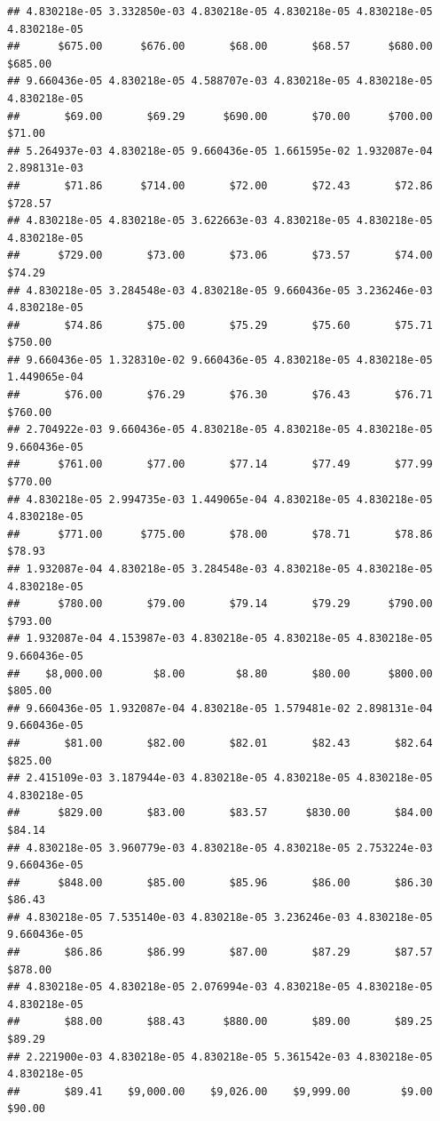 \begin{verbatim}
## 4.830218e-05 3.332850e-03 4.830218e-05 4.830218e-05 4.830218e-05 4.830218e-05 
##      $675.00      $676.00       $68.00       $68.57      $680.00      $685.00 
## 9.660436e-05 4.830218e-05 4.588707e-03 4.830218e-05 4.830218e-05 4.830218e-05 
##       $69.00       $69.29      $690.00       $70.00      $700.00       $71.00 
## 5.264937e-03 4.830218e-05 9.660436e-05 1.661595e-02 1.932087e-04 2.898131e-03 
##       $71.86      $714.00       $72.00       $72.43       $72.86      $728.57 
## 4.830218e-05 4.830218e-05 3.622663e-03 4.830218e-05 4.830218e-05 4.830218e-05 
##      $729.00       $73.00       $73.06       $73.57       $74.00       $74.29 
## 4.830218e-05 3.284548e-03 4.830218e-05 9.660436e-05 3.236246e-03 4.830218e-05 
##       $74.86       $75.00       $75.29       $75.60       $75.71      $750.00 
## 9.660436e-05 1.328310e-02 9.660436e-05 4.830218e-05 4.830218e-05 1.449065e-04 
##       $76.00       $76.29       $76.30       $76.43       $76.71      $760.00 
## 2.704922e-03 9.660436e-05 4.830218e-05 4.830218e-05 4.830218e-05 9.660436e-05 
##      $761.00       $77.00       $77.14       $77.49       $77.99      $770.00 
## 4.830218e-05 2.994735e-03 1.449065e-04 4.830218e-05 4.830218e-05 4.830218e-05 
##      $771.00      $775.00       $78.00       $78.71       $78.86       $78.93 
## 1.932087e-04 4.830218e-05 3.284548e-03 4.830218e-05 4.830218e-05 4.830218e-05 
##      $780.00       $79.00       $79.14       $79.29      $790.00      $793.00 
## 1.932087e-04 4.153987e-03 4.830218e-05 4.830218e-05 4.830218e-05 9.660436e-05 
##    $8,000.00        $8.00        $8.80       $80.00      $800.00      $805.00 
## 9.660436e-05 1.932087e-04 4.830218e-05 1.579481e-02 2.898131e-04 9.660436e-05 
##       $81.00       $82.00       $82.01       $82.43       $82.64      $825.00 
## 2.415109e-03 3.187944e-03 4.830218e-05 4.830218e-05 4.830218e-05 4.830218e-05 
##      $829.00       $83.00       $83.57      $830.00       $84.00       $84.14 
## 4.830218e-05 3.960779e-03 4.830218e-05 4.830218e-05 2.753224e-03 9.660436e-05 
##      $848.00       $85.00       $85.96       $86.00       $86.30       $86.43 
## 4.830218e-05 7.535140e-03 4.830218e-05 3.236246e-03 4.830218e-05 9.660436e-05 
##       $86.86       $86.99       $87.00       $87.29       $87.57      $878.00 
## 4.830218e-05 4.830218e-05 2.076994e-03 4.830218e-05 4.830218e-05 4.830218e-05 
##       $88.00       $88.43      $880.00       $89.00       $89.25       $89.29 
## 2.221900e-03 4.830218e-05 4.830218e-05 5.361542e-03 4.830218e-05 4.830218e-05 
##       $89.41    $9,000.00    $9,026.00    $9,999.00        $9.00       $90.00 

\end{verbatim}
